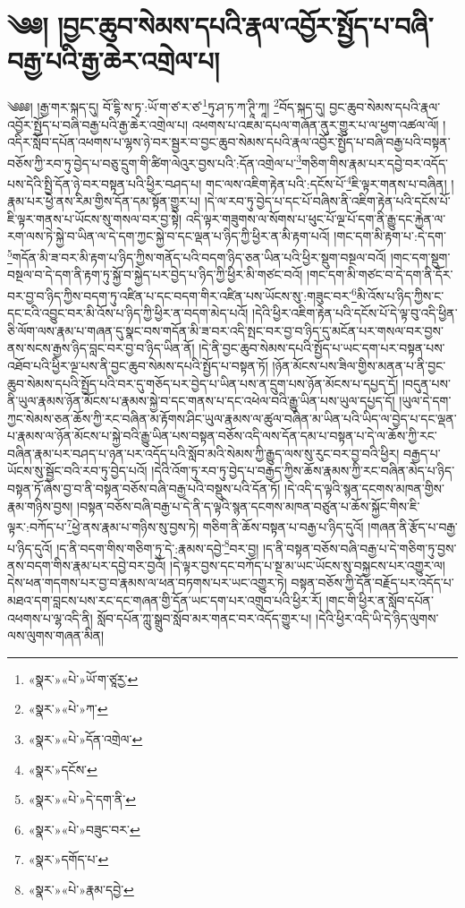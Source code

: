 \chapter{༄༅། །བྱང་ཆུབ་སེམས་དཔའི་རྣལ་འབྱོར་སྤྱོད་པ་བཞི་བརྒྱ་པའི་རྒྱ་ཆེར་འགྲེལ་པ།}༄༅༅། །རྒྱ་གར་སྐད་དུ། བོ་དྷི་ས་ཏྭ་:ཡོ་ག་ཙ་ར་ཙ་\footnote{«སྣར་»«པེ་»ཡོ་ག་ཙཱརྱ་}ཏུ་ཤ་ཏ་ཀ་ཊཱི་ཀཱ། \footnote{«སྣར་»«པེ་»ཀ་}བོད་སྐད་དུ། བྱང་ཆུབ་སེམས་དཔའི་རྣལ་འབྱོར་སྤྱོད་པ་བཞི་བརྒྱ་པའི་རྒྱ་ཆེར་འགྲེལ་པ། འཕགས་པ་འཇམ་དཔལ་གཞོན་ནུར་གྱུར་པ་ལ་ཕྱག་འཚལ་ལོ། །འདིར་སློབ་དཔོན་འཕགས་པ་ལྷས་ཉེ་བར་སྦྱར་བ་བྱང་ཆུབ་སེམས་དཔའི་རྣལ་འབྱོར་སྤྱོད་པ་བཞི་བརྒྱ་པའི་བསྟན་བཅོས་ཀྱི་རབ་ཏུ་བྱེད་པ་བཅུ་དྲུག་གི་ཚིག་ལེའུར་བྱས་པའི་:དོན་འགྲེལ་པ་\footnote{«སྣར་»«པེ་»དོན་འགྲེལ་}གཅིག་གིས་རྣམ་པར་དབྱེ་བར་འདོད་པས་དེའི་སྤྱི་དོན་ཉེ་བར་བསྟན་པའི་ཕྱིར་བཤད་པ། གང་ལས་འཇིག་རྟེན་པའི་:དངོས་པོ་\footnote{«སྣར་»དངོས་}ཇི་ལྟར་གནས་པ་བཞིན། །རྣམ་པར་ཕྱེ་ནས་རིམ་གྱིས་དོན་དམ་སྟོན་གྱུར་པ། །དེ་ལ་རབ་ཏུ་བྱེད་པ་དང་པོ་བཞིས་ནི་འཇིག་རྟེན་པའི་དངོས་པོ་ཇི་ལྟར་གནས་པ་ཡོངས་སུ་གསལ་བར་བྱ་སྟེ། འདི་ལྟར་གཟུགས་ལ་སོགས་པ་ཕུང་པོ་ལྔ་པོ་དག་ནི་རྒྱུ་དང་རྐྱེན་ལ་རག་ལས་ཏེ་སྐྱེ་བ་ཡིན་ལ་དེ་དག་ཀྱང་སྐྱེ་བ་དང་ལྡན་པ་ཉིད་ཀྱི་ཕྱིར་ན་མི་རྟག་པའོ། །གང་དག་མི་རྟག་པ་:དེ་དག་\footnote{«སྣར་»«པེ་»དེ་དག་ནི་}གདོན་མི་ཟ་བར་མི་རྟག་པ་ཉིད་ཀྱིས་གནོད་པའི་བདག་ཉིད་ཅན་ཡིན་པའི་ཕྱིར་སྡུག་བསྔལ་བའོ། །གང་དག་སྡུག་བསྔལ་བ་དེ་དག་ནི་རྟག་ཏུ་སྐྱོ་བ་སྐྱེད་པར་བྱེད་པ་ཉིད་ཀྱི་ཕྱིར་མི་གཙང་བའོ། །གང་དག་མི་གཙང་བ་དེ་དག་ནི་དོར་བར་བྱ་བ་ཉིད་ཀྱིས་བདག་ཏུ་འཛིན་པ་དང་བདག་གིར་འཛིན་པས་ཡོངས་སུ་:གཟུང་བར་\footnote{«སྣར་»«པེ་»བཟུང་བར་}མི་འོས་པ་ཉིད་ཀྱིས་ང་དང་ངའི་འབྱུང་བར་མི་འོས་པ་ཉིད་ཀྱི་ཕྱིར་ན་བདག་མེད་པའོ། །དེའི་ཕྱིར་འཇིག་རྟེན་པའི་དངོས་པོ་དེ་ལྟ་བུ་འདི་ཕྱིན་ཅི་ལོག་ལས་རྣམ་པ་གཞན་དུ་སྣང་བས་གདོན་མི་ཟ་བར་འདི་སྤང་བར་བྱ་བ་ཉིད་དུ་མངོན་པར་གསལ་བར་བྱས་ནས་སངས་རྒྱས་ཉིད་བླང་བར་བྱ་བ་ཉིད་ཡིན་ནོ། །དེ་ནི་བྱང་ཆུབ་སེམས་དཔའི་སྤྱོད་པ་ཡང་དག་པར་བསྟན་པས་འཐོབ་པའི་ཕྱིར་ལྔ་པས་ནི་བྱང་ཆུབ་སེམས་དཔའི་སྤྱོད་པ་བསྟན་ཏོ། །ཉོན་མོངས་པས་ཟིལ་གྱིས་མནན་པ་ནི་བྱང་ཆུབ་སེམས་དཔའི་སྤྱོད་པའི་བར་དུ་གཅོད་པར་བྱེད་པ་ཡིན་པས་ན་དྲུག་པས་ཉོན་མོངས་པ་དཔྱད་དོ། །བདུན་པས་ནི་ཡུལ་རྣམས་ཉོན་མོངས་པ་རྣམས་སྐྱེ་བ་དང་གནས་པ་དང་འཕེལ་བའི་རྒྱུ་ཡིན་པས་ཡུལ་དཔྱད་དོ། །ཡུལ་དེ་དག་ཀྱང་སེམས་ཅན་ཆོས་ཀྱི་རང་བཞིན་མ་རྟོགས་ཤིང་ཡུལ་རྣམས་ལ་ཚུལ་བཞིན་མ་ཡིན་པའི་ཡིད་ལ་བྱེད་པ་དང་ལྡན་པ་རྣམས་ལ་ཉོན་མོངས་པ་སྐྱེ་བའི་རྒྱུ་ཡིན་པས་བསྟན་བཅོས་འདི་ལས་དོན་དམ་པ་བསྟན་པ་དེ་ལ་ཆོས་ཀྱི་རང་བཞིན་རྣམ་པར་བཤད་པ་ཉན་པར་འདོད་པའི་སློབ་མའི་སེམས་ཀྱི་རྒྱུད་ལས་སུ་རུང་བར་བྱ་བའི་ཕྱིར། བརྒྱད་པ་ཡོངས་སུ་སྦྱོང་བའི་རབ་ཏུ་བྱེད་པའོ། །དེའི་འོག་ཏུ་རབ་ཏུ་བྱེད་པ་བརྒྱད་ཀྱིས་ཆོས་རྣམས་ཀྱི་རང་བཞིན་མེད་པ་ཉིད་བསྟན་ཏོ་ཞེས་བྱ་བ་ནི་བསྟན་བཅོས་བཞི་བརྒྱ་པའི་བསྡུས་པའི་དོན་ཏོ། །དེ་འདི་ད་ལྟའི་སྙན་དངགས་མཁན་གྱིས་རྣམ་གཉིས་བྱས། །བསྟན་བཅོས་བཞི་བརྒྱ་པ་དེ་ནི་ད་ལྟའི་སྙན་དངགས་མཁན་བཙུན་པ་ཆོས་སྐྱོང་གིས་ཇི་ལྟར་:བཀོད་པ་\footnote{«སྣར་»དགོད་པ་}ཕྱེ་ནས་རྣམ་པ་གཉིས་སུ་བྱས་ཏེ། གཅིག་ནི་ཆོས་བསྟན་པ་བརྒྱ་པ་ཉིད་དུའོ། །གཞན་ནི་རྩོད་པ་བརྒྱ་པ་ཉིད་དུའོ། །ད་ནི་བདག་གིས་གཅིག་ཏུ་དེ་:རྣམས་དབྱེ་\footnote{«སྣར་»«པེ་»རྣམ་དབྱེ་}བར་བྱ། །ད་ནི་བསྟན་བཅོས་བཞི་བརྒྱ་པ་དེ་གཅིག་ཏུ་བྱས་ནས་བདག་གིས་རྣམ་པར་དབྱེ་བར་བྱའོ། །དེ་ལྟར་བྱས་དང་བཀོད་པ་སྔ་མ་ཡང་ཡོངས་སུ་བསྐྱངས་པར་འགྱུར་ལ། དེས་ཕན་གདགས་པར་བྱ་བ་རྣམས་ལ་ཕན་བཏགས་པར་ཡང་འགྱུར་ཏེ། བསྟན་བཅོས་ཀྱི་དོན་བརྗོད་པར་འདོད་པ་མཐའ་དག་བླངས་པས་རང་དང་གཞན་གྱི་དོན་ཡང་དག་པར་འགྲུབ་པའི་ཕྱིར་རོ། །གང་གི་ཕྱིར་ན་སློབ་དཔོན་འཕགས་པ་ལྷ་འདི་ནི། སློབ་དཔོན་ཀླུ་སྒྲུབ་སློབ་མར་གནང་བར་འདོད་གྱུར་པ། །དེའི་ཕྱིར་འདི་ཡི་དེ་ཉིད་ལུགས་ལས་ལུགས་གཞན་མིན། 